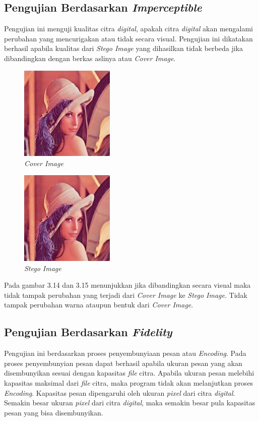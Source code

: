 	\subsection{Pengujian Berdasarkan \emph{Imperceptible}}
	Pengujian ini menguji kualitas citra \emph{digital}, apakah citra \emph{digital} akan mengalami perubahan yang mencurigakan atau tidak secara visual. Pengujian ini dikatakan berhasil apabila kualitas dari \emph{Stego Image} yang dihasilkan tidak berbeda jika dibandingkan dengan berkas aslinya atau \emph{Cover Image}.

	\begin{figure}[H]
		\centering
		\includegraphics[width=0.4\textwidth]{gambar/matlab/lena}
		\caption{\emph{Cover Image}}
		\label{lena_asli}
	\end{figure}

	\begin{figure}[H]
		\centering
		\includegraphics[width=0.4\textwidth]{gambar/matlab/lena_kalimat}
		\caption{\emph{Stego Image}}
		\label{lena_pesan}
	\end{figure}

	Pada gambar 3.14 dan 3.15 menunjukkan jika dibandingkan secara visual maka tidak tampak perubahan yang terjadi dari \emph{Cover Image} ke \emph{Stego Image}. Tidak tampak perubahan warna ataupun bentuk dari \emph{Cover Image}.

	\subsection{Pengujian Berdasarkan \emph{Fidelity}}
	Pengujian ini berdasarkan proses penyembunyiaan pesan atau \emph{Encoding}. Pada proses penyembunyian pesan dapat berhasil apabila ukuran pesan yang akan disembunyikan sesuai dengan kapasitas \emph{file} citra. Apabila ukuran pesan melebihi kapasitas maksimal dari \emph{file} citra, maka program tidak akan melanjutkan proses \emph{Encoding}. Kapasitas pesan dipengaruhi oleh ukuran \emph{pixel} dari citra \emph{digital}. Semakin besar ukuran \emph{pixel} dari citra \emph{digital}, maka semakin besar pula kapasitas pesan yang bisa disembunyikan.
	
